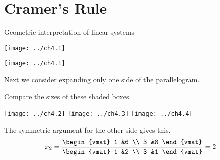 \documentclass[10pt,t]{beamer}
\begin{document}
\section{Cramer's Rule}
\begin{frame}{Geometric interpretation of linear systems}
\begin{center}
 \texttt{[image: ../ch4.1]}
\end{center}
\end{frame}
\begin{frame}
\begin{center}
 \texttt{[image: ../ch4.1]}
\end{center}

\pause
Next we consider expanding only one side of the parallelogram.
\end{frame}
\begin{frame}
Compare the sizes of these shaded boxes.
\begin{center}
   \texttt{[image: ../ch4.2]}
   \hfil
   \texttt{[image: ../ch4.3]}
   \hfil
   \texttt{[image: ../ch4.4]}
\end{center}
\pause
{}
\end{frame}
\begin{frame}
\pause
The symmetric argument for the other side gives this.
\begin{equation*}
  x_2=
  \frac{
  \begin{vmat}
    1  &6  \\
    3  &8
  \end{vmat}}{
  \begin{vmat}
    1  &2  \\
    3  &1
  \end{vmat}}
  =2
\end{equation*}
\end{frame}
\end{document}
